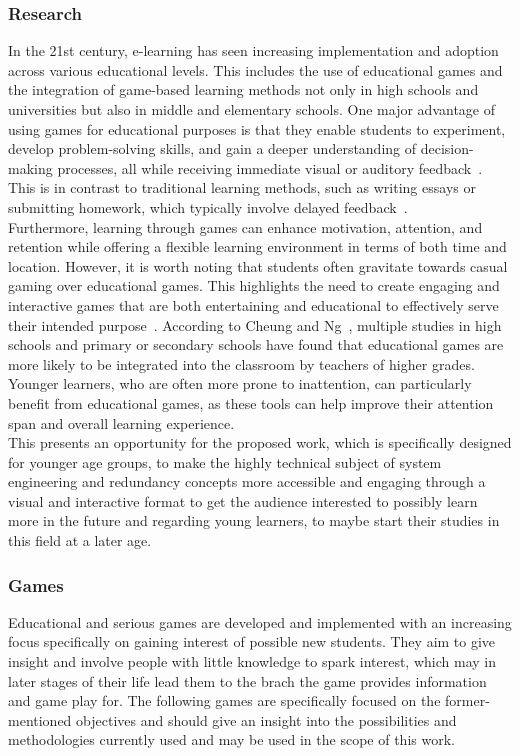 \subsubsection{Research}\label{subsubsec:research}
In the 21st century, e-learning has seen increasing implementation and adoption across various educational levels.
This includes the use of educational games and the integration of game-based learning methods not only in
high schools and universities but also in middle and elementary schools.
One major advantage of using games for educational purposes is that they enable students to experiment,
develop problem-solving skills, and gain a deeper understanding of decision-making processes,
all while receiving immediate visual or auditory feedback~\cite{application-of-education-games-to-enhance-student-learning}.
This is in contrast to traditional learning methods, such as writing essays or submitting homework,
which typically involve delayed feedback~\cite{more-than-just-fun-and-games}.
\\
Furthermore, learning through games can enhance motivation, attention, and retention while offering a flexible learning environment
in terms of both time and location.
However, it is worth noting that students often gravitate towards casual gaming over educational games.
This highlights the need to create engaging and interactive games that are both entertaining and educational to
effectively serve their intended purpose~\cite{WHITTON}.
According to Cheung and Ng~\cite{application-of-education-games-to-enhance-student-learning}, multiple studies in high schools and primary or secondary schools have found that educational
games are more likely to be integrated into the classroom by teachers of higher grades.
Younger learners, who are often more prone to inattention, can particularly benefit from
educational games, as these tools can help improve their attention span and overall learning experience.
\\
This presents an opportunity for the proposed work, which is specifically designed for younger age groups, to make the highly
technical subject of system engineering and redundancy concepts more accessible and engaging through a visual and interactive format
to get the audience interested to possibly learn more in the future and regarding young learners, to maybe start their studies
in this field at a later age.
\\
\subsubsection{Games}\label{subsubsec:games}
Educational and serious games are developed and implemented with an increasing focus specifically on gaining
interest of possible new students.
They aim to give insight and involve people with little knowledge to spark interest, which may in later stages of their
life lead them to the brach the game provides information and game play for.
The following games are specifically focused on the former-mentioned objectives and should give an insight into
the possibilities and methodologies currently used and may be used in the scope of this work.

